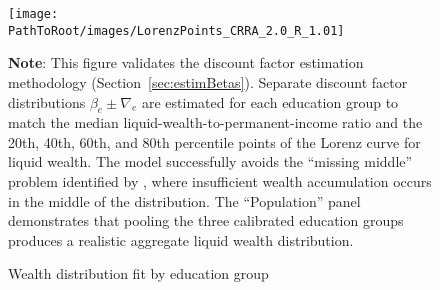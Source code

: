 \documentclass[\PathToRoot/\ProjectName]{subfiles}
\begin{document}
\begin{figure}[htb] 
  \centering
  \caption{Wealth distribution fit by education group}
  \whenintegrated{\label{fig:LorenzPts}} 
  \texttt{[image: \\PathToRoot/images/LorenzPoints\_CRRA\_2.0\_R\_1.01]}

  \medskip
  \noindent\parbox{\textwidth}{\footnotesize
    \textbf{Note}: This figure validates the discount factor estimation methodology (Section~\ref{sec:estimBetas}).
    Separate discount factor distributions $\beta_e \pm \nabla_e$ are estimated for each education group
    to match the median liquid-wealth-to-permanent-income ratio and the 20th, 40th, 60th, and 80th
    percentile points of the Lorenz curve for liquid wealth.
    The model successfully avoids the ``missing middle'' problem identified by \cite{kaplanMPC2022},
    where insufficient wealth accumulation occurs in the middle of the distribution.
    The ``Population'' panel demonstrates that pooling the three calibrated education groups
    produces a realistic aggregate liquid wealth distribution.
  }
\end{figure}

\vspace{0.5em}

\smartbib
\end{document}
